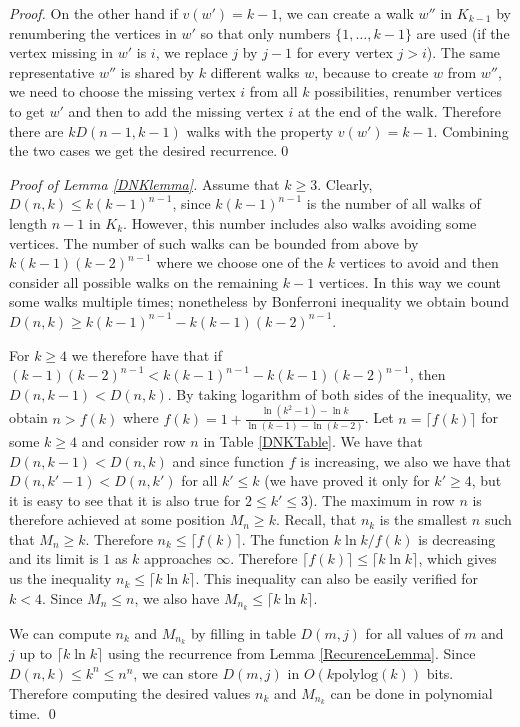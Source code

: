 \begin{reformulate*}
\begin{proof}
On the other hand if $v(w')=k-1$, we can create a walk $w''$ in
$K_{k-1}$ by renumbering the vertices in $w'$ so that only numbers
$\{1,\dots,k-1\}$ are used (if the vertex missing in $w'$ is $i$, we
replace $j$ by $j-1$ for every vertex $j>i$).  The same
representative $w''$ is shared by $k$ different walks $w$, because to
create $w$ from $w''$, we need to choose the missing vertex $i$ from
all $k$ possibilities, renumber vertices to get $w'$ and then to add
the missing vertex $i$ at the end of the walk. Therefore there are
$kD(n-1,k-1)$ walks with the property $v(w')=k-1$. Combining the two
cases we get the desired recurrence.\qed
\end{proof}

\begin{proof}[Proof of Lemma \ref{DNKlemma}] 
Assume that $k\ge 3$. Clearly, $D(n,k)\leq k(k-1)^{n-1}$, since
$k(k-1)^{n-1}$ is the number of all walks of length $n-1$ in
$K_k$. However, this number includes also walks avoiding some
vertices. The number of such walks can be bounded from above by
$k(k-1)(k-2)^{n-1}$ where we choose one of the $k$ vertices to avoid
and then consider all possible walks on the remaining $k-1$
vertices. In this way we count some walks multiple times; nonetheless
by Bonferroni inequality we obtain bound $D(n,k)\geq
k(k-1)^{n-1}-k(k-1)(k-2)^{n-1}$.

For $k\ge 4$ we therefore have that if
$(k-1)(k-2)^{n-1}<k(k-1)^{n-1}-k(k-1)(k-2)^{n-1}$, then
$D(n,k-1)<D(n,k)$.  By taking logarithm of both sides of the inequality, we
obtain $n>f(k)$ where $f(k) = 1+\frac{\ln(k^2-1)-\ln
  k}{\ln(k-1)-\ln(k-2)}$.  Let $n = \lceil f(k)\rceil$ for some $k\ge
4$ and consider row $n$ in Table \ref{DNKTable}.
We have that $D(n,k-1)<D(n,k)$ and since function $f$ is
increasing, we also we have that $D(n,k'-1)<D(n,k')$ for all $k'\le k$ 
(we have proved it only for $k'\ge 4$, but it is easy to see that it is
also true for $2\le k'\le 3$). The maximum in row $n$ is therefore
achieved at some position $M_n \ge k$. Recall, that $n_k$ is the
smallest $n$ such that $M_n\ge k$. Therefore $n_k\leq \lceil f(k)\rceil$.
The function $k \ln k/f(k)$ is decreasing and its limit is $1$ as $k$
approaches $\infty$. Therefore $\lceil f(k)\rceil\leq\lceil k\ln k\rceil$,
which gives us the inequality $n_k\le \lceil k \ln k\rceil$. This inequality 
can also be easily verified for $k<4$. Since $M_n\le n$,
we also have $M_{n_k}\le \lceil k \ln k\rceil$. 

We can compute $n_k$ and $M_{n_k}$ by filling in table $D(m,j)$ for
all values of $m$ and $j$ up to $\lceil k\ln k\rceil$ using the
recurrence from Lemma \ref{RecurenceLemma}. Since $D(n,k)\leq k^n\leq
n^n$, we can store $D(m,j)$ in $O(k \mbox{polylog}(k))$ bits.
Therefore computing the desired values $n_k$ and $M_{n_k}$ 
can be done in polynomial time. \qed
\end{proof}


\end{reformulate*}
